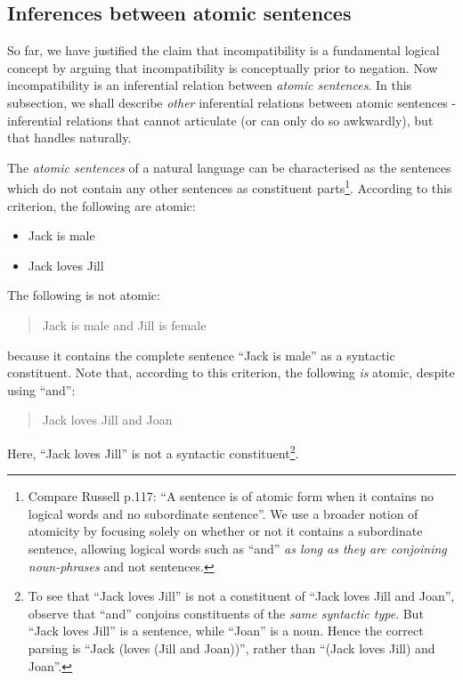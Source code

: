 \subsection{Inferences between atomic sentences}
\label{intrasentential}
So far, we have justified the claim that incompatibility is a
fundamental logical concept by arguing that incompatibility is
conceptually prior to negation.  Now incompatibility is an inferential
relation between \emph{atomic sentences}.  In this subsection, we
shall describe \emph{other} inferential relations between atomic
sentences - inferential relations that \fol{} cannot articulate (or
can only do so awkwardly), but that \cathoristic{} handles naturally.

The \emph{atomic sentences} of a natural language can be
characterised as the sentences which do not contain any other
sentences as constituent parts\footnote{Compare Russell \cite{russell}
  p.117: ``A sentence is of atomic form when it contains no logical
  words and no subordinate sentence''. We use a broader notion of
  atomicity by focusing solely on whether or not it contains a
  subordinate sentence, allowing logical words such as ``and'' \emph{as long
  as they are conjoining noun-phrases} and not sentences.}.  According
to this criterion, the following are atomic:

\begin{itemize}

\item Jack is male
\item Jack loves Jill
\end{itemize}

\NI The following is not atomic:

\begin{quote}
  Jack is male and Jill is female
\end{quote}

\NI because it contains the complete sentence ``Jack is male'' as a
syntactic constituent.  Note that, according to this criterion, the
following \emph{is} atomic, despite using ``and'':

\begin{quote}
  Jack loves Jill and Joan
\end{quote}

\NI Here, ``Jack loves Jill'' is not a syntactic constituent\footnote{To see that ``Jack loves Jill'' is not a constituent of ``Jack loves Jill and Joan'', observe that ``and'' conjoins constituents of the \emph{same syntactic type}. But ``Jack loves Jill'' is a sentence, while ``Joan'' is a noun. Hence the correct parsing is ``Jack (loves (Jill and Joan))'', rather than ``(Jack loves Jill) and Joan''.}.

